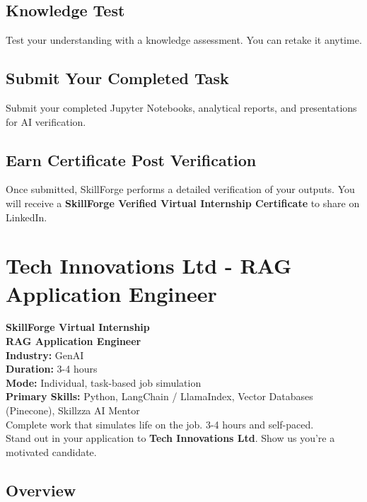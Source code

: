 \documentclass{article}
\begin{document}
\subsection*{Knowledge Test}
Test your understanding with a knowledge assessment. You can retake it anytime.\\

\subsection*{Submit Your Completed Task}
Submit your completed Jupyter Notebooks, analytical reports, and presentations for AI verification.\\

\subsection*{Earn Certificate Post Verification}
Once submitted, SkillForge performs a detailed verification of your outputs. You will receive a \textbf{SkillForge Verified Virtual Internship Certificate} to share on LinkedIn.\\

\newpage

\section{Tech Innovations Ltd - RAG Application Engineer}

\textbf{SkillForge Virtual Internship} \\
\textbf{RAG Application Engineer} \\

\textbf{Industry:} GenAI \\
\textbf{Duration:} 3-4 hours \\
\textbf{Mode:} Individual, task-based job simulation \\
\textbf{Primary Skills:} Python, LangChain / LlamaIndex, Vector Databases (Pinecone), Skillzza AI Mentor \\

Complete work that simulates life on the job. 3-4 hours and self-paced. \\
Stand out in your application to \textbf{Tech Innovations Ltd}. Show us you're a motivated candidate. \\

\subsection*{Overview}
\end{document}
